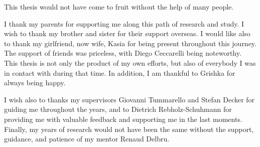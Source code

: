This thesis would not have come to fruit without the help of many people.

I thank my parents for supporting me along this path of research and study. I wish to thank my brother and sister for their support overseas. I would like also to thank my girlfriend, now wife, Kasia for being present throughout this journey. The support of friends was priceless, with Diego Ceccarelli being noteworthy. This thesis is not only the product of my own efforts, but also of everybody I was in contact with during that time. In addition, I am thankful to Grishka for always being happy.

I wish also to thanks my supervisors Giovanni Tummarello and Stefan Decker for guiding me throughout the years, and to Dietrich Rebholz-Schuhmann for providing me with valuable feedback and supporting me in the last moments. Finally, my years of research would not have been the same without the support, guidance, and patience of my mentor Renaud Delbru.
